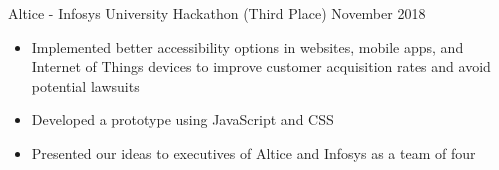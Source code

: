 \documentclass{article}
\begin{document}
\noindent
Altice - Infosys University Hackathon (Third Place)
\hfill
November 2018\\
\vspace{-1em}
\begin{itemize}
\item Implemented better accessibility options in websites, mobile apps, and Internet of Things devices to improve customer acquisition rates and avoid potential lawsuits
\item Developed a prototype using JavaScript and CSS
\item Presented our ideas to executives of Altice and Infosys as a team of four
\end{itemize}


\noindent
\end{document}
